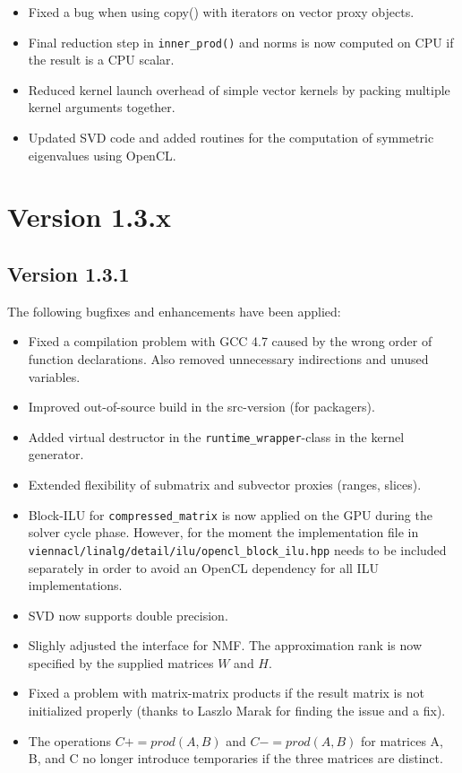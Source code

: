 \begin{itemize}
 \item Fixed a bug when using copy() with iterators on vector proxy objects.
 \item Final reduction step in \lstinline|inner_prod()| and norms is now computed on CPU if the result is a CPU scalar.
 \item Reduced kernel launch overhead of simple vector kernels by packing multiple kernel arguments together.
 \item Updated SVD code and added routines for the computation of symmetric eigenvalues using OpenCL.
\end{itemize}





\section*{Version 1.3.x}

\subsection*{Version 1.3.1}
The following bugfixes and enhancements have been applied:
\begin{itemize}
 \item Fixed a compilation problem with GCC 4.7 caused by the wrong order of function declarations. Also removed unnecessary indirections and unused variables.
 \item Improved out-of-source build in the src-version (for packagers).
 \item Added virtual destructor in the \lstinline|runtime_wrapper|-class in the kernel generator.
 \item Extended flexibility of submatrix and subvector proxies (ranges, slices).
 \item Block-ILU for \lstinline|compressed_matrix| is now applied on the GPU during the solver cycle phase. However, for the moment the implementation file in \newline \texttt{viennacl/linalg/detail/ilu/opencl\_block\_ilu.hpp} needs to be included separately in order to avoid an OpenCL dependency for all ILU implementations.
 \item SVD now supports double precision.
 \item Slighly adjusted the interface for NMF. The approximation rank is now specified by the supplied matrices $W$ and $H$.
 \item Fixed a problem with matrix-matrix products if the result matrix is not initialized properly (thanks to Laszlo Marak for finding the issue and a fix).
 \item The operations $C += prod(A, B)$ and $C -= prod(A, B)$ for matrices A, B, and C no longer introduce temporaries if the three matrices are distinct.
\end{itemize}



